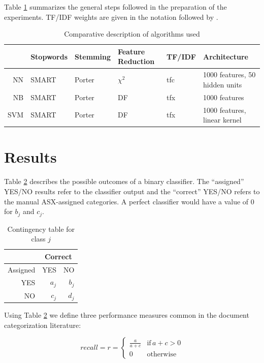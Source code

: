 \documentclass[a4paper,twocolumn]{article}
\begin{document}
Table \ref{algos} summarizes the general steps followed in the
preparation of the experiments.  TF/IDF weights are given in the
notation followed by \cite{salton:88}.

\begin{table}
\begin{tabularx}{\linewidth}{|r|l|l|l|l|X|}
\hline
& Stopwords & Stemming & Feature Reduction & TF/IDF & Architecture\\
\hline
NN & SMART & Porter & $\chi^2$ & tfc & 1000 features, 50 hidden units \\
\hline
NB & SMART & Porter & DF & tfx & 1000 features \\
\hline
SVM & SMART & Porter & DF & tfx & 1000 features, linear kernel \\

\hline
\end{tabularx}
\caption{Comparative description of algorithms used}
\label{algos}
\end{table}


\section{Results}
\label{results}


Table \ref{contingency} describes the possible outcomes of a binary
classifier.  The ``assigned'' YES/NO results refer to the classifier
output and the ``correct'' YES/NO refers to the manual ASX-assigned
categories. A perfect classifier would have a value of 0 for $b_j$ and
$c_j$.

\begin{table}
\begin{tabular}{|r|r|r|}
\hline
& \multicolumn{2}{|c|}{Correct} \\
\hline
Assigned & YES & NO \\
\hline
YES & $a_j$ & $b_j$ \\
\hline
NO & $c_j$ & $d_j$ \\
\hline
\end{tabular}
\caption{Contingency table for class $j$}
\label{contingency}
\end{table}

Using Table \ref{contingency} we define three performance measures
common in the document categorization literature:

\begin{displaymath}
recall = r = \left\{ \begin{array}{ll}
\frac{a}{a+c} & \textrm{if} \, a+c>0 \\
0                  & \textrm{otherwise}
\end{array} \right.
\end{displaymath}
\end{document}
